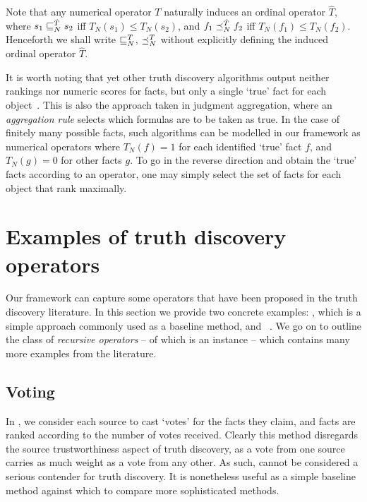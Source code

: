 Note that any numerical operator $T$ naturally induces an ordinal operator
$\hat{T}$, where ${s_1 \sqsubseteq_N^{\hat{T}} s_2}$ iff ${T_N(s_1) \le T_N(s_2)}$, and
${f_1 \preceq_N^{\hat{T}} f_2}$ iff ${T_N(f_1) \le T_N(f_2)}$. Henceforth we shall
write $\sqsubseteq_N^T$, $\preceq_N^T$ without explicitly defining the induced ordinal
operator $\hat{T}$.

It is worth noting that yet other truth discovery algorithms output neither
rankings nor numeric scores for facts, but only a single `true' fact for each
object~\cite{li2016,ding_finding_2016,yang_continuous_2018}. This is also the
approach taken in judgment aggregation, where an \emph{aggregation rule}
selects which formulas are to be taken as true. In the case of finitely many
possible facts, such algorithms can be modelled in our framework as numerical
operators where $T_N(f) = 1$ for each identified `true' fact $f$, and $T_N(g) =
0$ for other facts $g$. To go in the reverse direction and obtain the `true'
facts according to an operator, one may simply select the set of facts for each
object that rank maximally.

\section{Examples of truth discovery operators}
\label{td_sec_specific_operators}

Our framework can capture some operators that have
been proposed in the truth discovery literature. In this section we provide two
concrete examples: \voting{}, which is a simple approach commonly used as a
baseline method, and \sums{}~\cite{pasternack2010}. We go on to outline the
class of \emph{recursive operators} -- of which \sums{} is an instance -- which
contains many more examples from the literature.

\subsection{Voting}
\label{td_sec_voting}

In \voting{}, we consider each source to cast `votes' for the facts they claim,
and facts are ranked according to the number of votes received. Clearly this
method disregards the source trustworthiness aspect of truth discovery, as a
vote from one source carries as much weight as a vote from any other. As such,
\voting{} cannot be considered a serious contender for truth discovery. It is
nonetheless useful as a simple baseline method against which to compare more
sophisticated methods.

